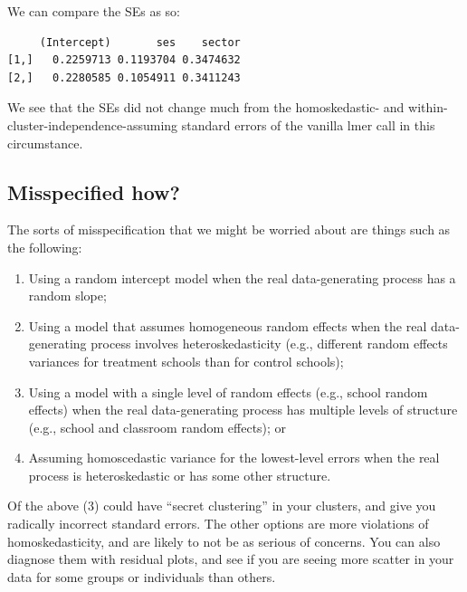 \documentclass[
  letterpaper,
  DIV=11,
  numbers=noendperiod]{scrreprt}
\newenvironment{Shaded}{\begin{snugshade}}{\end{snugshade}}
\newcommand{\FunctionTok}[1]{\textcolor[rgb]{0.02,0.16,0.49}{#1}}
\newcommand{\NormalTok}[1]{\textcolor[rgb]{0.00,0.44,0.13}{#1}}
\newcommand{\SpecialCharTok}[1]{\textcolor[rgb]{0.25,0.44,0.63}{#1}}
\providecommand{\tightlist}{%
  \setlength{\itemsep}{0pt}\setlength{\parskip}{0pt}}\usepackage{longtable,booktabs,array}
\begin{document}
We can compare the SEs as so:

\begin{Shaded}
\end{Shaded}

\begin{verbatim}
     (Intercept)       ses    sector
[1,]   0.2259713 0.1193704 0.3474632
[2,]   0.2280585 0.1054911 0.3411243
\end{verbatim}

We see that the SEs did not change much from the homoskedastic- and
within-cluster-independence-assuming standard errors of the vanilla lmer
call in this circumstance.

\hypertarget{misspecified-how}{%
\subsection{Misspecified how?}\label{misspecified-how}}

The sorts of misspecification that we might be worried about are things
such as the following:

\begin{enumerate}
\def\labelenumi{\arabic{enumi}.}
\tightlist
\item
  Using a random intercept model when the real data-generating process
  has a random slope;
\item
  Using a model that assumes homogeneous random effects when the real
  data-generating process involves heteroskedasticity (e.g., different
  random effects variances for treatment schools than for control
  schools);
\item
  Using a model with a single level of random effects (e.g., school
  random effects) when the real data-generating process has multiple
  levels of structure (e.g., school and classroom random effects); or
\item
  Assuming homoscedastic variance for the lowest-level errors when the
  real process is heteroskedastic or has some other structure.
\end{enumerate}

Of the above (3) could have ``secret clustering'' in your clusters, and
give you radically incorrect standard errors. The other options are more
violations of homoskedasticity, and are likely to not be as serious of
concerns. You can also diagnose them with residual plots, and see if you
are seeing more scatter in your data for some groups or individuals than
others.
\end{document}
